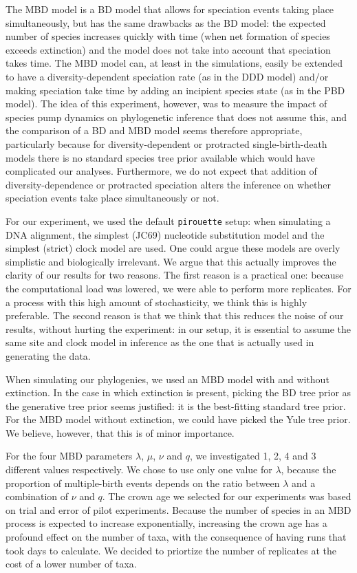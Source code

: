 The MBD model is a BD model that allows for speciation events taking place simultaneously, but has
the same drawbacks as the BD model: the expected number of species increases quickly with time (when net formation of species exceeds extinction) and the model does not take into account that speciation takes time.
The MBD model can, at least in the simulations, easily
be extended to have a diversity-dependent speciation rate (as in the 
DDD model) and/or making speciation take time by adding 
an incipient species state (as in the PBD model).
The idea of this experiment, however, was to measure the impact of species pump dynamics on phylogenetic inference that does not assume this, and the comparison of a BD and MBD model seems therefore appropriate, particularly because for diversity-dependent or protracted single-birth-death models there is no standard species tree prior available which would have complicated our analyses. Furthermore, we do not expect that addition of diversity-dependence or protracted speciation alters the inference on whether speciation events take place simultaneously or not.

For our experiment, we used the default \verb;pirouette; setup:
when simulating a DNA alignment, the simplest (JC69) nucleotide
substitution model and the simplest (strict) clock model are used. 
One could argue these models
are overly simplistic and biologically irrelevant. We argue that this
actually improves the clarity of our results for two reasons. The first
reason is a practical one: because the computational load was lowered,
we were able to perform more replicates. For a process with this high
amount of stochasticity, we think this is highly preferable. The second reason
is that we think that this reduces the noise of our results, without 
hurting the experiment: in our setup, it is essential
to assume the same site and clock model in inference as the one that is actually used in generating the data.

When simulating our phylogenies, we used an MBD model with and without
extinction. In the case in which extinction is present,
picking the BD tree prior as the generative tree prior seems justified:
it is the best-fitting standard tree prior. For the MBD model without
extinction, we could have picked the Yule tree prior. We believe, however,
that this is of minor importance.

For the four MBD parameters $\lambda$, $\mu$, $\nu$ and $q$,
we investigated 1, 2, 4 and 3 different values respectively.
We chose to use only one value for $\lambda$, because the proportion of multiple-birth events depends on the ratio
between $\lambda$ and a combination of $\nu$ and $q$.  
The crown age we selected for our experiments was based on trial and error
of pilot experiments. Because the number of species in an MBD process is
expected to increase exponentially, increasing the crown age has a
profound effect on the number of taxa, with the consequence of having
runs that took days to calculate. We decided to priortize the number of replicates at the cost of a lower number of taxa.

